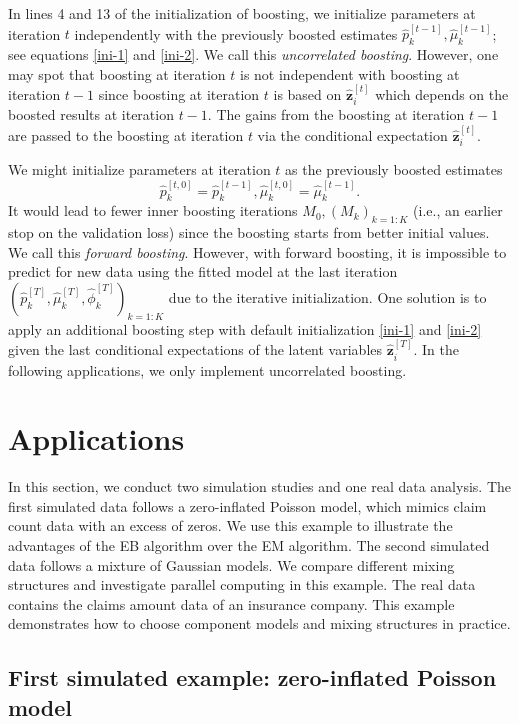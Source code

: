 \documentclass[11pt]{article}
\numberwithin{equation}{section}
\def\bz{\boldsymbol{z}}
\begin{document}
In lines 4 and 13 of the initialization of boosting, 
we initialize parameters at iteration $t$ {independently} with the previously boosted estimates $\hat{p}_k^{[t-1]}, \hat{\mu}_k^{[t-1]}$; see equations \eqref{ini-1} and \eqref{ini-2}. We call this {\it uncorrelated boosting}. However, one may spot that boosting at iteration $t$ is not independent with boosting at iteration $t-1$ 
since boosting at iteration $t$ is based on $\hat{\bz}_i^{[t]}$ which depends on the boosted results at iteration $t-1$. The gains from the boosting at iteration $t-1$ are passed to  the boosting at iteration $t$ via the conditional expectation $\hat{\bz}_i^{[t]}$. 
	
We might initialize parameters at iteration $t$ as the previously boosted estimates $$\hat{p}_k^{[t,0]}=\hat{p}_k^{[t-1]}, \hat{\mu}_k^{[t,0]}=\hat{\mu}_k^{[t-1]}.$$
It would lead to fewer inner boosting iterations $M_0,(M_k)_{k=1:K}$ (i.e., an {earlier} stop on the validation loss) since the boosting starts from better initial values.
	We call this {\it forward boosting}. 
	However, with forward boosting, it is impossible to predict for new data using the fitted model at the last iteration $(\hat{p}_k^{[T]},\hat{\mu}_k^{[T]},\hat{\phi}_k^{[T]})_{k=1:K}$ due to the {iterative initialization}. 
	One solution is to apply an additional boosting step with default initialization \eqref{ini-1} and \eqref{ini-2} given the {last conditional expectations of the latent variables $\hat{\bz}^{[T]}_i$}. 
	In the following applications, we only implement uncorrelated boosting.

	
\section{Applications}\label{sec:application}

In this section, we conduct two simulation studies and one real data analysis. 
The first simulated data follows a zero-inflated Poisson model, which mimics claim count data with an excess of zeros.
We use this example to illustrate the advantages of the EB algorithm over the EM algorithm.
The second simulated data follows a mixture of Gaussian models. 
We compare different mixing structures and  investigate parallel computing in this example.
The real data contains the claims amount data of an insurance company. 
This example demonstrates how to choose component models and mixing structures in practice.

\subsection{First simulated example: zero-inflated Poisson model}
\end{document}
